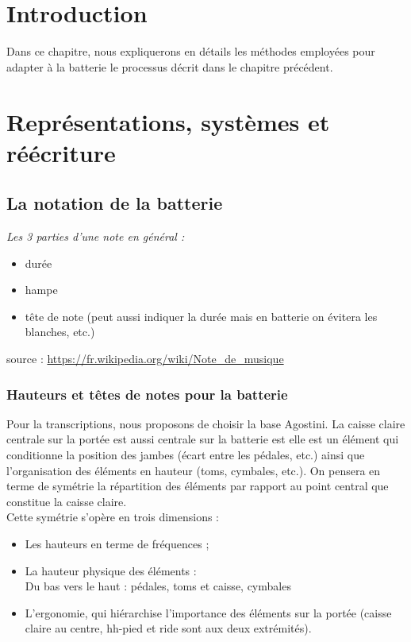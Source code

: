 \section{Introduction}
Dans ce chapitre, nous expliquerons en détails les méthodes employées pour adapter à la batterie le processus décrit dans le chapitre précédent.
\newpage

\section{Représentations, systèmes et réécriture}
\subsection*{La notation de la batterie}

\textit{Les 3 parties d’une note en général :}
\begin{itemize}
	\item durée
	\item hampe
	\item tête de note (peut aussi indiquer la durée mais en batterie on évitera les blanches, etc.)
\end{itemize}
source : \url{https://fr.wikipedia.org/wiki/Note_de_musique}

\subsubsection{Hauteurs et têtes de notes pour la batterie}
Pour la transcriptions, nous proposons de choisir la base Agostini. La caisse claire centrale sur la portée est aussi centrale sur la batterie est elle est un élément qui conditionne la position des jambes (écart entre les pédales, etc.) ainsi que l’organisation des éléments en hauteur (toms, cymbales, etc.).
On pensera en terme de symétrie la répartition des éléments par rapport au point central que constitue la caisse claire.\\
Cette symétrie s’opère en trois dimensions :
\begin{itemize}
	\item Les hauteurs en terme de fréquences ;
	\item La hauteur physique des éléments :\\
	Du bas vers le haut : pédales, toms et caisse, cymbales
	\item L’ergonomie, qui hiérarchise l’importance des éléments sur la portée (caisse claire au centre, hh-pied et ride sont aux deux extrémités).
\end{itemize}


